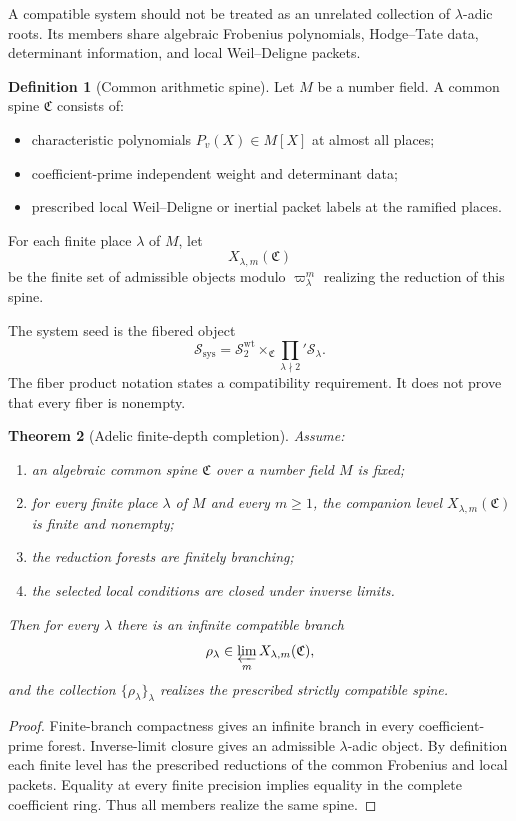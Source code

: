 \documentclass[11pt]{article}
\newtheorem{theorem}{Theorem}[section]
\theoremstyle{definition}
\newtheorem{definition}[theorem]{Definition}
\theoremstyle{remark}
\newcommand{\Sys}{\mathscr S}
\newcommand{\Compat}{\mathfrak C}
\begin{document}
A compatible system should not be treated as an unrelated collection of \(\lambda\)-adic roots.  Its members share algebraic Frobenius polynomials, Hodge--Tate data, determinant information, and local Weil--Deligne packets.

\begin{definition}[Common arithmetic spine]
Let \(M\) be a number field.  A common spine \(\Compat\) consists of:
\begin{itemize}
\item characteristic polynomials \(P_v(X)\in M[X]\) at almost all places;
\item coefficient-prime independent weight and determinant data;
\item prescribed local Weil--Deligne or inertial packet labels at the ramified places.
\end{itemize}
For each finite place \(\lambda\) of \(M\), let
\[
X_{\lambda,m}(\Compat)
\]
be the finite set of admissible objects modulo \(\varpi_\lambda^m\) realizing the reduction of this spine.
\end{definition}

The system seed is the fibered object
\[
\boxed{
\Sys_{\mathrm{sys}}
=
\Sys_2^{\mathrm{wt}}
\times_{\Compat}
\prod_{\lambda\nmid2}'\Sys_\lambda.
}
\]
The fiber product notation states a compatibility requirement.  It does not prove that every fiber is nonempty.

\begin{theorem}[Adelic finite-depth completion]
Assume:
\begin{enumerate}
\item an algebraic common spine \(\Compat\) over a number field \(M\) is fixed;
\item for every finite place \(\lambda\) of \(M\) and every \(m\ge1\), the companion level \(X_{\lambda,m}(\Compat)\) is finite and nonempty;
\item the reduction forests are finitely branching;
\item the selected local conditions are closed under inverse limits.
\end{enumerate}
Then for every \(\lambda\) there is an infinite compatible branch
\[
\rho_\lambda\in\varprojlim_mX_{\lambda,m}(\Compat),
\]
and the collection \(\{\rho_\lambda\}_\lambda\) realizes the prescribed strictly compatible spine.
\end{theorem}

\begin{proof}
Finite-branch compactness gives an infinite branch in every coefficient-prime forest.  Inverse-limit closure gives an admissible \(\lambda\)-adic object.  By definition each finite level has the prescribed reductions of the common Frobenius and local packets.  Equality at every finite precision implies equality in the complete coefficient ring.  Thus all members realize the same spine.
\end{proof}
\end{document}
